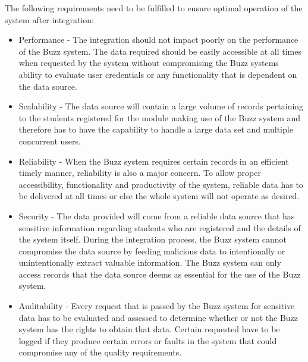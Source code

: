 The following requirements need to be fulfilled to ensure optimal operation of the system after integration:
\begin{itemize}

\item Performance - The integration should not impact poorly on the performance of the Buzz system. The data required should be easily accessible at all times when requested by the system without compromising the Buzz systems ability to evaluate user credentials or any functionality that is dependent on the data source.
\item Scalability - The data source will contain a large volume of records pertaining to the students registered for the module making use of the Buzz system and therefore has to have the capability to handle a large data set and multiple concurrent users.
\item Reliability - When the Buzz system requires certain records in an efficient timely manner, reliability is also a major concern. To allow proper accessibility, functionality and productivity of the system, reliable data has to be delivered at all times or else the whole system will not operate as desired.
\item Security - The data provided will come from a reliable data source that has sensitive information regarding students who are registered and the details of the system itself. During the integration process, the Buzz system cannot compromise the data source by feeding malicious data to intentionally or unintentionally extract valuable information. The Buzz system can only access records that the data source deems as essential for the use of the Buzz system.
\item Auditability - Every request that is passed by the Buzz system for sensitive data has to be evaluated and assessed to determine whether or not the Buzz system has the rights to obtain that data. Certain requested have to be logged if they produce certain errors or faults in the system that could compromise any of the quality requirements.
\end{itemize}